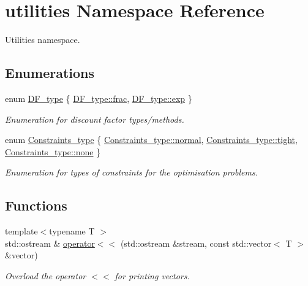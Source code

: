 \hypertarget{namespaceutilities}{}\section{utilities Namespace Reference}
\label{namespaceutilities}


Utilities namespace.  


\subsection*{Enumerations}
\begin{DoxyCompactItemize}
\item 
enum \hyperlink{namespaceutilities_ad4290e607d0651ce53db6e5c776aca7c}{D\+F\+\_\+type} \{ \hyperlink{namespaceutilities_ad4290e607d0651ce53db6e5c776aca7ca8a3baba97ec51277ed8ac64e456f6027}{D\+F\+\_\+type\+::frac}, 
\hyperlink{namespaceutilities_ad4290e607d0651ce53db6e5c776aca7cab0ab0254bd58eb87eaee3172ba49fefb}{D\+F\+\_\+type\+::exp}
 \}\begin{DoxyCompactList}\small\item\em Enumeration for discount factor types/methods. \end{DoxyCompactList}
\item 
enum \hyperlink{namespaceutilities_ab1a1517bf6e62a1acfab5293ca8985c1}{Constraints\+\_\+type} \{ \hyperlink{namespaceutilities_ab1a1517bf6e62a1acfab5293ca8985c1afea087517c26fadd409bd4b9dc642555}{Constraints\+\_\+type\+::normal}, 
\hyperlink{namespaceutilities_ab1a1517bf6e62a1acfab5293ca8985c1a0423fa423baf1ea8139f6662869faf2f}{Constraints\+\_\+type\+::tight}, 
\hyperlink{namespaceutilities_ab1a1517bf6e62a1acfab5293ca8985c1a334c4a4c42fdb79d7ebc3e73b517e6f8}{Constraints\+\_\+type\+::none}
 \}\begin{DoxyCompactList}\small\item\em Enumeration for types of constraints for the optimisation problems. \end{DoxyCompactList}
\end{DoxyCompactItemize}
\subsection*{Functions}
\begin{DoxyCompactItemize}
\item 
{\footnotesize template$<$typename T $>$ }\\std\+::ostream \& \hyperlink{namespaceutilities_a4b168c00efe29cabc5846b48225a6e52}{operator$<$$<$} (std\+::ostream \&stream, const std\+::vector$<$ T $>$ \&vector)
\begin{DoxyCompactList}\small\item\em Overload the operator $<$$<$ for printing vectors. \end{DoxyCompactList}\end{DoxyCompactItemize}


